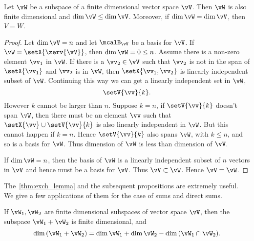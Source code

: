\begin{Proposition}
    Let $\vW$ be a subspace of a finite dimensional vector space $\vV$. Then $\vW$ is also finite dimensional
    and $\dim{\vW} \leq \dim{\vV}$. Moreover, if $\dim{\vW} = \dim{\vV}$, then $V = W$.
\end{Proposition}
\begin{proof}
    Let $\dim{\vV} = n$ and let $\mcalB_{\vV}$ be a basis for $\vV$. If $\vW = \setX{\zerv{\vV}}$, then
    $\dim{\vW} = 0 \leq n$. Assume there is a non-zero element $\vv_{1}$ in $\vW$. If there is a $\vv_{2} \in
    \vV$ such that $\vv_{2}$ is not in the span of $\setX{\vv_{1}}$ and $\vv_{2}$ is in $\vW$, then
    $\setX{\vv_{1},\vv_{2}}$ is linearly independent subset of $\vW$. Continuing this way we can get a linearly
    independent set in $\vW$,
    \[\setV{\vv}{k}.\]
    However $k$ cannot be larger than $n$. Suppose $k = n$, 
    if $\setV{\vv}{k}$ doesn't span $\vW$, then there must be an
    element $\vv$ such that $\setX{\vv} \cup \setV{\vv}{k}$ is also linearly independent in $\vW$. But this
    cannot happen if $k = n$. Hence $\setV{\vv}{k}$ also spans $\vW$, with $k \leq n$, 
    and so is a basis for $\vW$. Thus
    dimension of $\vW$ is less than dimension of $\vV$.

    If $\dim{\vW} = n$, then the basis of $\vW$ is a linearly independent subset of $n$ vectors in $\vV$ and
    hence must be a basis for $\vV$. Thus $\vV \subset \vW$. Hence $\vV = \vW$.
\end{proof}
The~\ref{thm:exch_lemma} and the subsequent propositions are extremely useful. We give a few applications of them
for the case of sums and direct sums.
\begin{Proposition}
    If $\vW_{1},\vW_{2}$ are finite dimensional subspaces of vector space $\vV$, then the subspace 
    $\vW_{1} + \vW_{2}$ is finite dimensional, and
    \[\dim{(\vW_{1} + \vW_{2})} = \dim{\vW_{1}} + \dim{\vW_{2}} - \dim{(\vW_{1}\cap\vW_{2})}.\]
\end{Proposition}
